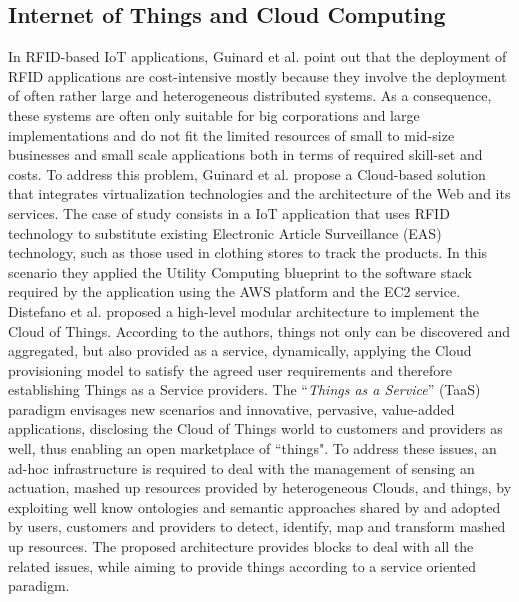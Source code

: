 \subsection{Internet of Things and Cloud Computing}
\label{sub:Cloud Computing and Internet of Things}
In RFID-based IoT applications, Guinard et al. \cite{guinard2011cloud} point out that the
deployment of RFID applications are cost-intensive mostly because they involve the
deployment of often rather large and heterogeneous distributed systems. As a consequence,
these systems are often only suitable for big corporations and large implementations and
do not fit the limited resources of small to mid-size businesses and small scale applications
both in terms of required skill-set and costs. To address this problem, Guinard et al. propose
a Cloud-based solution that integrates virtualization technologies and the architecture of
the Web and its services. The case of study consists in a IoT application that uses RFID technology
to substitute existing Electronic Article Surveillance (EAS) technology, such as those used in
clothing stores to track the products. In this scenario they applied the Utility Computing blueprint
to the software stack required by the application using the AWS platform and the EC2 service.\\
Distefano \cite{distefano2012enabling} et al. proposed a high-level modular architecture to implement the
Cloud of Things. According to the authors, things not only can be discovered and aggregated, but also
provided as a service, dynamically, applying the Cloud provisioning model to satisfy the agreed
user requirements and therefore establishing Things as a Service providers. The ``\textit{Things as a Service}'' (TaaS)
paradigm envisages new scenarios and innovative, pervasive, value-added applications,
disclosing the Cloud of Things world to customers and providers as well, thus enabling an open
marketplace of ``things". To address these issues, an ad-hoc infrastructure is required to deal
with the management of sensing an actuation, mashed up resources provided by heterogeneous Clouds,
and things, by exploiting well know ontologies and semantic approaches shared by and adopted by users,
customers and providers to detect, identify, map and transform mashed up resources.
The proposed architecture provides blocks to deal with all the related issues, while aiming
to provide things according to a service oriented paradigm.\\
